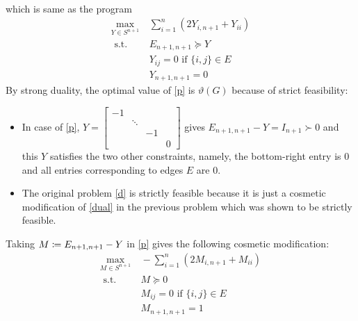 \begin{enumerate}[leftmargin=*]
\begin{pf}
\begin{align*}
\end{align*}
which is same as the program \begin{equation}\tag{($P'$)}\label{p}
\begin{aligned}
\max_{Y \in S^{n+1}}&~ \sum_{i=1}^{n} \left(2Y_{i,n+1} + Y_{ii}\right)
 \\
\text { s.t. } &~ E_{n+1,n+1}\succeq Y\\
&~ Y_{ij} = 0 \text { if }\{i, j\} \in E\\
&~ Y_{n+1,n+1} = 0 
\end{aligned}
\end{equation}
By strong duality, the optimal value of \ref{p} is $\vartheta(G)$ because of strict feasibility: 
\begin{itemize}
\item In case of \ref{p}, $Y = \begin{bmatrix}-1\\&\ddots\\&&-1\\&&&0\end{bmatrix}$ gives $E_{n+1,n+1}-Y = I_{n+1} \succ 0$ and this $Y$ satisfies the two other constraints, namely, the bottom-right entry is $0$ and all entries corresponding to edges $E$ are $0$. 
\item The original problem \ref{d} is strictly feasible because it is just a cosmetic modification of \ref{dual} in the previous problem which was shown to be strictly feasible.\end{itemize}
Taking $M\coloneqq E_{n+1,n+1}-Y$ in \ref{p} gives the following cosmetic modification:
\begin{equation}\tag{($P''$)}\label{pp}
\begin{aligned}
\max _{M \in S^{n+1}}&~ -\sum_{i=1}^{n} \left(2M_{i,n+1} + M_{ii}\right)
 \\
\text { s.t. } &~ M\succeq 0\\
&~ M_{ij} = 0 \text { if }\{i, j\} \in E\\
&~ M_{n+1,n+1} = 1
\end{aligned}
\end{equation}


\end{pf}
\end{enumerate}
